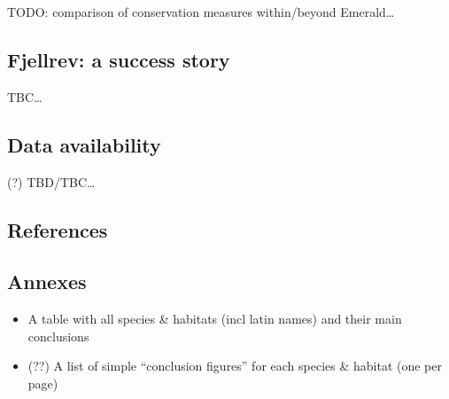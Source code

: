\documentclass[
  letterpaper,
  DIV=11,
  numbers=noendperiod]{scrartcl}
\providecommand{\tightlist}{%
  \setlength{\itemsep}{0pt}\setlength{\parskip}{0pt}}
\begin{document}
TODO: comparison of conservation measures within/beyond Emerald\ldots{}

\subsection{Fjellrev: a success story}\label{fjellrev-a-success-story}

TBC\ldots{}

\subsection{Data availability}\label{data-availability}

(?) TBD/TBC\ldots{}

\subsection{References}\label{references}

\subsection{Annexes}\label{annexes}

\begin{itemize}
\tightlist
\item
  A table with all species \& habitats (incl latin names) and their main
  conclusions
\item
  (??) A list of simple ``conclusion figures'' for each species \&
  habitat (one per page)
\end{itemize}
\end{document}
